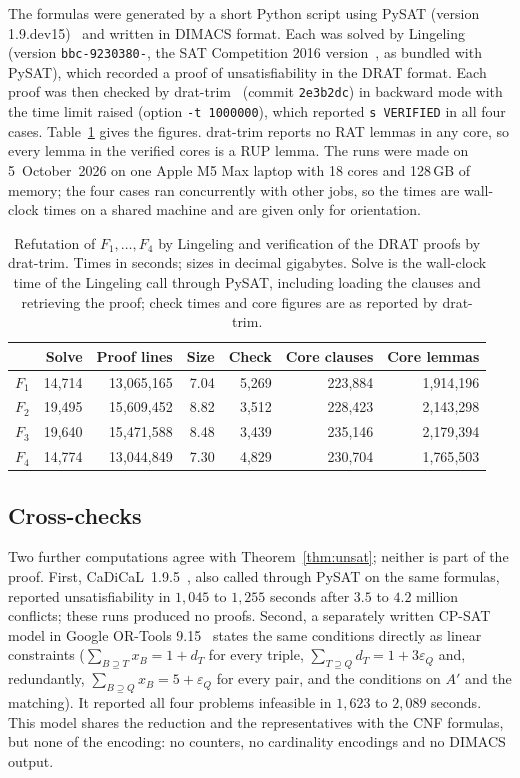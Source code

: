 \documentclass[11pt]{amsart}
\theoremstyle{definition}
\theoremstyle{remark}
\begin{document}
The formulas were generated by a short Python script using PySAT
(version 1.9.dev15)~\cite{ignatiev2018} and written in DIMACS format. Each was
solved by Lingeling (version \texttt{bbc-9230380-}, the SAT
Competition 2016 version~\cite{lingeling}, as bundled with PySAT), which
recorded a proof of unsatisfiability in the DRAT format. Each proof was then
checked by drat-trim~\cite{wetzler2014} (commit \texttt{2e3b2dc}) in backward
mode with the time limit raised (option \texttt{-t 1000000}), which reported
\texttt{s VERIFIED} in all four cases. Table~\ref{tab:runs} gives the
figures. drat-trim reports no RAT lemmas in any core, so every lemma in the
verified cores is a RUP lemma. The runs were
made on 5~October~2026 on one Apple M5 Max laptop with 18 cores and 128\,GB
of memory; the four cases ran concurrently with other jobs, so the times are
wall-clock times on a shared machine and are given only for orientation.

\begin{table}[ht]
\centering
\small
\caption{Refutation of $F_1,\dots,F_4$ by Lingeling and verification of the
DRAT proofs by drat-trim. Times in seconds; sizes in decimal gigabytes.
Solve is the wall-clock time of the Lingeling call through PySAT, including
loading the clauses and retrieving the proof; check times and core figures
are as reported by drat-trim.}\label{tab:runs}
\begin{tabular}{@{}lrrrrrr@{}}
\toprule
 & Solve & Proof lines & Size & Check & Core clauses & Core lemmas\\
\midrule
$F_1$ & 14{,}714 & 13{,}065{,}165 & 7.04 & 5{,}269 & 223{,}884 & 1{,}914{,}196\\
$F_2$ & 19{,}495 & 15{,}609{,}452 & 8.82 & 3{,}512 & 228{,}423 & 2{,}143{,}298\\
$F_3$ & 19{,}640 & 15{,}471{,}588 & 8.48 & 3{,}439 & 235{,}146 & 2{,}179{,}394\\
$F_4$ & 14{,}774 & 13{,}044{,}849 & 7.30 & 4{,}829 & 230{,}704 & 1{,}765{,}503\\
\bottomrule
\end{tabular}
\end{table}

\subsection*{Cross-checks}
Two further computations agree with Theorem~\ref{thm:unsat}; neither is part
of the proof. First, CaDiCaL~1.9.5~\cite{cadical}, also called through PySAT
on the same formulas, reported unsatisfiability in $1{,}045$ to $1{,}255$
seconds after $3.5$ to $4.2$ million conflicts; these runs produced no
proofs. Second, a separately written CP-SAT model in Google OR-Tools
9.15~\cite{ortools} states the same conditions directly as linear constraints
($\sum_{B\supseteq T}x_B=1+d_T$ for every triple, $\sum_{T\supseteq Q}d_T=
1+3\varepsilon_Q$ and, redundantly, $\sum_{B\supseteq Q}x_B=5+\varepsilon_Q$
for every pair, and the conditions on $A'$ and the matching). It reported all
four problems infeasible in $1{,}623$ to $2{,}089$ seconds. This model shares
the reduction and the representatives with the CNF formulas, but none of the
encoding: no counters, no cardinality encodings and no DIMACS output.
\end{document}
